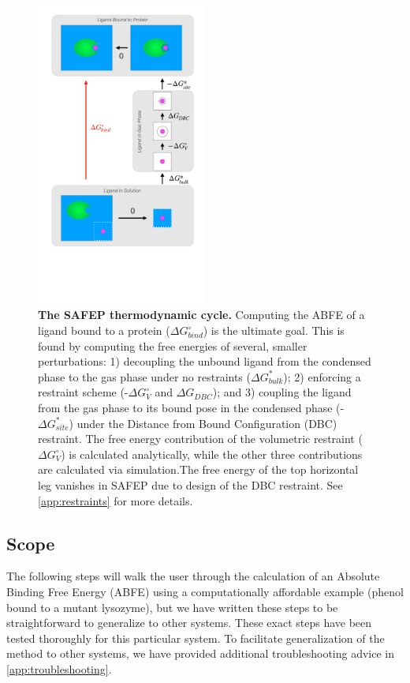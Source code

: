 \documentclass[9pt,tutorial]{Styling/livecoms}
\begin{document}
\begin{figure}[!ht]
    \centering
    \includegraphics[width=0.5\textwidth]{SAFEP_cycle.pdf}
    \caption{\textbf{The SAFEP thermodynamic cycle.} 
    Computing the ABFE of a ligand bound to a protein ($\Delta G^\circ_{bind}$) is the ultimate goal. 
    This is found by computing the free energies of several, smaller perturbations: 1) decoupling the unbound ligand from the condensed phase to the gas phase under no restraints ($\Delta G^*_{bulk}$); 2) enforcing a restraint scheme (-$\Delta G^\circ_V$ and $\Delta G_{DBC}$); and 3) coupling the ligand from the gas phase to its bound pose in the condensed phase (-$\Delta G^*_{site}$) under the Distance from Bound Configuration (DBC) restraint.
    The free energy contribution of the volumetric restraint ($\Delta G^\circ_{V}$) is calculated analytically, while the other three contributions are calculated via simulation.The free energy of the top horizontal leg vanishes in SAFEP due to design of the DBC restraint. See \ref{app:restraints} for more details.}
    \label{fig:cycle}
\end{figure}

\subsection{Scope}
The following steps will walk the user through the calculation of an Absolute Binding Free Energy (ABFE) using a computationally affordable example (phenol bound to a mutant lysozyme), but we have written these steps to be straightforward to generalize to other systems.
These exact steps have been tested thoroughly for this particular system. To facilitate generalization of the method to other systems, we have provided additional troubleshooting advice in \ref{app:troubleshooting}.
\end{document}
